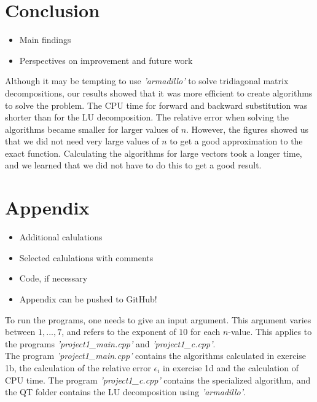 \documentclass[12pt]{article}
\begin{document}
\section{Conclusion}

\begin{itemize}
\item Main findings
\item Perspectives on improvement and future work
\end{itemize}

\noindent Although it may be tempting to use \textit{'armadillo'} to solve tridiagonal matrix decompositions, our results showed that it was more efficient to create algorithms to solve the problem. The CPU time for forward and backward substitution was shorter than for the LU decomposition. The relative error when solving the algorithms became smaller for larger values of $n$. However, the figures showed us that we did not need very large values of $n$ to get a good approximation to the exact function. Calculating the algorithms for large vectors took a longer time, and we learned that we did not have to do this to get a good result. 


\section{Appendix}

\begin{itemize}
\item Additional calulations
\item Selected calulations with comments
\item Code, if necessary
\item Appendix can be pushed to GitHub!
\end{itemize}

\noindent To run the programs, one needs to give an input argument. This argument varies between $1,...,7$, and refers to the exponent of $10$ for each $n$-value. This applies to the programs \textit{'project1\_main.cpp'} and \textit{'project1\_c.cpp'}. \\

\noindent The program \textit{'project1\_main.cpp'} contains the algorithms calculated in exercise 1b, the calculation of the relative error $\epsilon_i$ in exercise 1d and the calculation of CPU time. The program \textit{'project1\_c.cpp'} contains the specialized algorithm, and the QT folder contains the LU decomposition using \textit{'armadillo'}. \\
\end{document}
